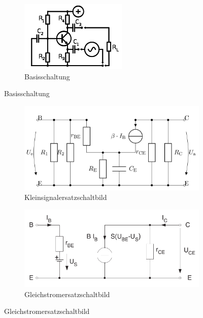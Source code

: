 \begin{figure}[h]
			\begin{subfigure}{0.3\textwidth}
			\begin{center}
			\includegraphics[width=\textwidth]{images/basisschaltung}
			\caption{Basisschaltung}
			\end{center}
			\end{subfigure}
		\end{figure}
		
		\begin{figure}[h]
			\begin{subfigure}{0.5\textwidth}
			\includegraphics[width=\textwidth]{images/kleinsignal}
			\caption{Kleinsignalersatzschaltbild}
			\end{subfigure}
			\begin{subfigure}{0.5\textwidth}
			\includegraphics[width=\textwidth]{images/gleichstrom}
			\caption{Gleichstromersatzschaltbild}
			\end{subfigure}
		\end{figure}

